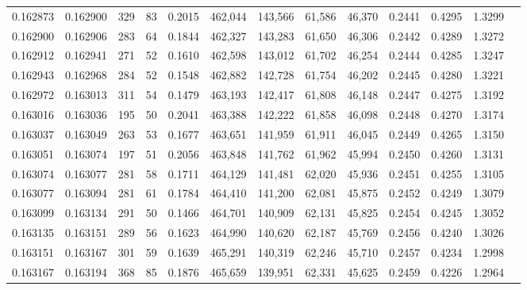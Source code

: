 \begin{tabular}{rrrrrrrrrrrrr}
0.162873 & 0.162900 &   329 &  83 &                                     0.2015 & 462,044 & 143,566 &  61,586 &  46,370 & 0.2441 & 0.4295 & 1.3299 \\
0.162900 & 0.162906 &   283 &  64 &                                     0.1844 & 462,327 & 143,283 &  61,650 &  46,306 & 0.2442 & 0.4289 & 1.3272 \\
0.162912 & 0.162941 &   271 &  52 &                                     0.1610 & 462,598 & 143,012 &  61,702 &  46,254 & 0.2444 & 0.4285 & 1.3247 \\
0.162943 & 0.162968 &   284 &  52 &                                     0.1548 & 462,882 & 142,728 &  61,754 &  46,202 & 0.2445 & 0.4280 & 1.3221 \\
0.162972 & 0.163013 &   311 &  54 &                                     0.1479 & 463,193 & 142,417 &  61,808 &  46,148 & 0.2447 & 0.4275 & 1.3192 \\
0.163016 & 0.163036 &   195 &  50 &                                     0.2041 & 463,388 & 142,222 &  61,858 &  46,098 & 0.2448 & 0.4270 & 1.3174 \\
0.163037 & 0.163049 &   263 &  53 &                                     0.1677 & 463,651 & 141,959 &  61,911 &  46,045 & 0.2449 & 0.4265 & 1.3150 \\
0.163051 & 0.163074 &   197 &  51 &                                     0.2056 & 463,848 & 141,762 &  61,962 &  45,994 & 0.2450 & 0.4260 & 1.3131 \\
0.163074 & 0.163077 &   281 &  58 &                                     0.1711 & 464,129 & 141,481 &  62,020 &  45,936 & 0.2451 & 0.4255 & 1.3105 \\
0.163077 & 0.163094 &   281 &  61 &                                     0.1784 & 464,410 & 141,200 &  62,081 &  45,875 & 0.2452 & 0.4249 & 1.3079 \\
0.163099 & 0.163134 &   291 &  50 &                                     0.1466 & 464,701 & 140,909 &  62,131 &  45,825 & 0.2454 & 0.4245 & 1.3052 \\
0.163135 & 0.163151 &   289 &  56 &                                     0.1623 & 464,990 & 140,620 &  62,187 &  45,769 & 0.2456 & 0.4240 & 1.3026 \\
0.163151 & 0.163167 &   301 &  59 &                                     0.1639 & 465,291 & 140,319 &  62,246 &  45,710 & 0.2457 & 0.4234 & 1.2998 \\
0.163167 & 0.163194 &   368 &  85 &                                     0.1876 & 465,659 & 139,951 &  62,331 &  45,625 & 0.2459 & 0.4226 & 1.2964 \\

\end{tabular}
